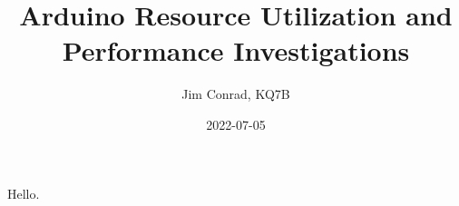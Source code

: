 \documentclass{article}
\title{Arduino Resource Utilization and Performance Investigations}
\date{2022-07-05}
\author{Jim Conrad, KQ7B}
\begin{document}
  \maketitle
  \newpage


Hello.
\end{document}
